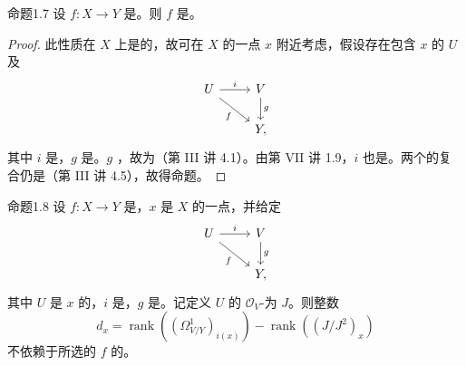 \begin{SGAresult}{命题}{1.7}
设 $f:X\to Y$ 是。则 $f$ 是。
\end{SGAresult}
\begin{proof}
此性质在 $X$ 上是的，故可在 $X$ 的一点 $x$ 附近考虑，假设存在包含 $x$ 的 $U$ 及
\[
\begin{tikzcd}U\arrow[r,"i"]\arrow[dr,"f"']&V\arrow[d,"g"]\\&Y,\end{tikzcd}
\]
其中 $i$ 是，$g$ 是。$g$ ，故为（第 III 讲 4.1）。由第 VII 讲 1.9，$i$ 也是。两个的复合仍是（第 III 讲 4.5），故得命题。
\end{proof}
\begin{SGAresult}{命题}{1.8}
设 $f:X\to Y$ 是，$x$ 是 $X$ 的一点，并给定
\[
\begin{tikzcd}U\arrow[r,"i"]\arrow[dr,"f"']&V\arrow[d,"g"]\\&Y,\end{tikzcd}
\]
其中 $U$ 是 $x$ 的，$i$ 是，$g$ 是。记定义 $U$ 的 $\mathscr O_V$-为 $J$。则整数
\[d_x=\operatorname{rank}((\Omega^1_{V/Y})_{i(x)})-\operatorname{rank}((J/J^2)_x)\]
不依赖于所选的 $f$ 的。
\end{SGAresult}
